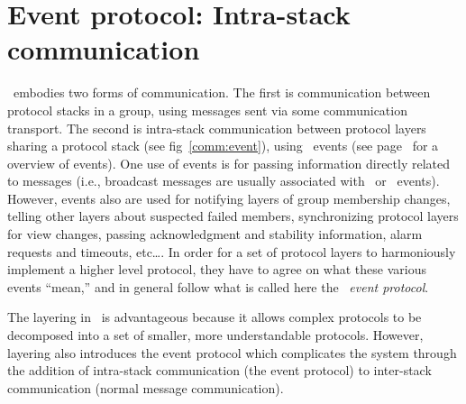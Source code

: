 %
%
%
\newcommand {\eventtype}[2]	{\item {#1:} #2}

\newenvironment{EventType}{%
\begin{itemize}
}{\end{itemize}
}

\newcommand {\chainentry}[2]	{#1 & #2 \\ \hline}

\newenvironment{ChainTable}{%
\begin{quote}\begin{tabular}{|l|l|} \hline
}{\end{tabular}\end{quote}
}

\section{Event protocol: Intra-stack communication}
\label{event:protocol}
\ensemble\ embodies two forms of communication.  The first is communication
between protocol stacks in a group, using messages sent via some
communication transport.  The second is intra-stack communication between
protocol layers sharing a protocol stack (see fig~\ref{comm:event}), using
\ensemble\ events (see page~\pageref{event:module} for a overview of \ensemble
events).  One use of events is for passing information directly related to
messages (i.e., broadcast messages are usually associated with \UpCast\ or
\DnCast\ events).  However, events also are used for notifying layers of
group membership changes, telling other layers about suspected failed
members, synchronizing protocol layers for view changes, passing
acknowledgment and stability information, alarm requests and timeouts,
etc\ldots.  In order for a set of protocol layers to harmoniously implement
a higher level protocol, they have to agree on what these various events
``mean,'' and in general follow what is called here the \ensemble\ \emph{event
protocol}.

The layering in \ensemble\ is advantageous because it allows complex protocols
to be decomposed into a set of smaller, more understandable protocols.
However, layering also introduces the event protocol which complicates the
system through the addition of intra-stack communication (the event
protocol) to inter-stack communication (normal message communication).

